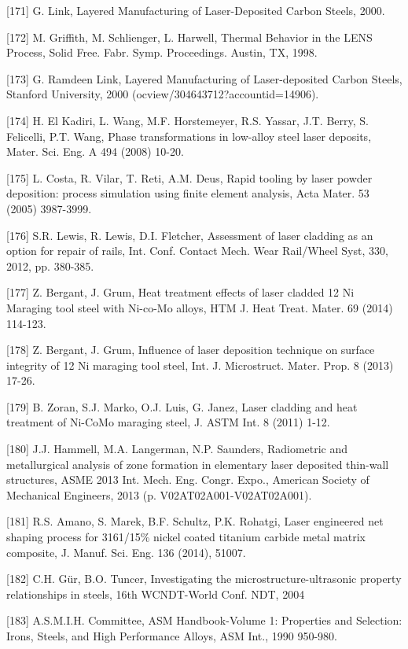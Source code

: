 \documentclass[10pt]{article}
\begin{document}
[171] G. Link, Layered Manufacturing of Laser-Deposited Carbon Steels, 2000.

[172] M. Griffith, M. Schlienger, L. Harwell, Thermal Behavior in the LENS Process, Solid Free. Fabr. Symp. Proceedings. Austin, TX, 1998.

[173] G. Ramdeen Link, Layered Manufacturing of Laser-deposited Carbon Steels, Stanford University, 2000 (ocview/304643712?accountid=14906).

[174] H. El Kadiri, L. Wang, M.F. Horstemeyer, R.S. Yassar, J.T. Berry, S. Felicelli, P.T. Wang, Phase transformations in low-alloy steel laser deposits, Mater. Sci. Eng. A 494 (2008) 10-20.

[175] L. Costa, R. Vilar, T. Reti, A.M. Deus, Rapid tooling by laser powder deposition: process simulation using finite element analysis, Acta Mater. 53 (2005) 3987-3999.

[176] S.R. Lewis, R. Lewis, D.I. Fletcher, Assessment of laser cladding as an option for repair of rails, Int. Conf. Contact Mech. Wear Rail/Wheel Syst, 330, 2012, pp. 380-385.

[177] Z. Bergant, J. Grum, Heat treatment effects of laser cladded 12 Ni Maraging tool steel with Ni-co-Mo alloys, HTM J. Heat Treat. Mater. 69 (2014) 114-123.

[178] Z. Bergant, J. Grum, Influence of laser deposition technique on surface integrity of 12 Ni maraging tool steel, Int. J. Microstruct. Mater. Prop. 8 (2013) 17-26.

[179] B. Zoran, S.J. Marko, O.J. Luis, G. Janez, Laser cladding and heat treatment of Ni-CoMo maraging steel, J. ASTM Int. 8 (2011) 1-12.

[180] J.J. Hammell, M.A. Langerman, N.P. Saunders, Radiometric and metallurgical analysis of zone formation in elementary laser deposited thin-wall structures, ASME 2013 Int. Mech. Eng. Congr. Expo., American Society of Mechanical Engineers, 2013 (p. V02AT02A001-V02AT02A001).

[181] R.S. Amano, S. Marek, B.F. Schultz, P.K. Rohatgi, Laser engineered net shaping process for 3161/15\% nickel coated titanium carbide metal matrix composite, J. Manuf. Sci. Eng. 136 (2014), 51007.

[182] C.H. Gür, B.O. Tuncer, Investigating the microstructure-ultrasonic property relationships in steels, 16th WCNDT-World Conf. NDT, 2004

[183] A.S.M.I.H. Committee, ASM Handbook-Volume 1: Properties and Selection: Irons, Steels, and High Performance Alloys, ASM Int., 1990 950-980.
\end{document}
